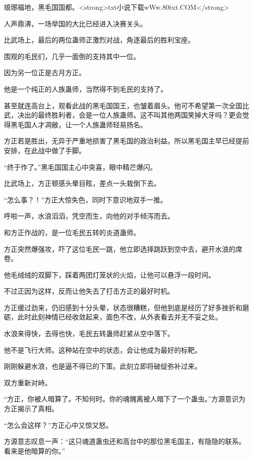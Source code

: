 
\begin{this_body}

琅琊福地，黑毛国国都。<strong>txt小说下载wWw.80txt.COM</strong>

人声鼎沸，一场举国的大比已经进入决赛关头。

比武场上，最后的两位蛊师正激烈对战，角逐最后的胜利宝座。

围观的毛民们，几乎一面倒的支持其中一位。

因为另一位正是古月方正。

他是一个纯正的人族蛊师，当然得不到毛民的支持了。

甚至就连高台上，观看此战的黑毛国国王，也皱着眉头。他可不希望第一次全国比武，决出的最终胜利者，会是一位人族蛊师。这不叫其他两国笑掉大牙吗？更会觉得黑毛国人才凋敝，让一个人族蛊师轻易扬名。

方正若是胜出，无异于严重地损害了黑毛国的政治利益。所以黑毛国主早已经提前安排，在此战中做了手脚。

“终于作了。”黑毛国国主心中突喜，眼中精芒爆闪。

比武场上，方正顿感头晕目眩，差点一头栽倒下去。

“怎么事？！”方正大惊失色，同时下意识地双手一推。

呼啦一声，水浪滔滔，凭空而生，向他的对手倾泻而去。

和方正作战的，是一位毛民五转的炎道蛊师。

方正突然爆强攻，吓了这位毛民一跳，他立即选择跳跃到空中去，避开水浪的席卷。

他毛绒绒的双脚下，踩着两团灯笼状的火焰，让他可以悬浮一段时间。

不过正因为这样，反而让他失去了打击方正的最好时机。

方正缓过劲来，仍旧感到十分头晕，状态很糟糕，但他到底是经历了好多挫折和磨砺，此时此刻神情已经收敛起来，面色不改，从外表看去并无不妥之处。

水浪来得快，去得也快，毛民五转蛊师赶紧从空中落下。

他不是飞行大师。这种站在空中的状态，会让他成为最好的标靶。

刚刚躲避水浪，也是逼不得已的下策。此刻立即将破绽弥补过来。

双方重新对峙。

“方正，你被人暗算了。不知何时。你的魂魄离被人暗下了一个蛊虫。”方源意识为方正揭示了真相。

“怎么会这样？”方正心中又惊又怒。

方源意志叹息一声：“这只魂道蛊虫还和高台中的那位黑毛国主，有隐隐的联系。看来是他暗算的你。”


\end{this_body}
